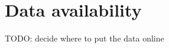 \documentclass[10pt,a4paper,twocolumn]{article}
\begin{document}


\title{}



\maketitle
\thispagestyle{fancy}

\begin{abstract}

\end{abstract}
\clearpage







\section*{Data availability}

TODO: decide where to put the data online










{\small
}
\end{document}
